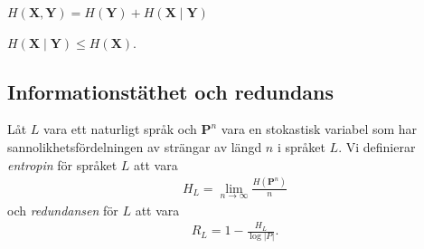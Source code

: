 \documentclass{beamer}
\let\stoch\mathbf{}
\begin{document}
\begin{frame}
  \begin{theorem}
    \(H(\stoch X, \stoch Y) = H(\stoch Y) + H(\stoch X\mid \stoch Y)\)
  \end{theorem}
%
%
  \begin{corollary}
    \(H(\stoch X\mid \stoch Y) \leq H(\stoch X)\).
  \end{corollary}
\end{frame}
%
%

\subsection{Informationstäthet och redundans}

\begin{frame}
  \begin{definition}
    Låt \(L\) vara ett naturligt språk och \(\stoch P^n\) vara en stokastisk 
    variabel som har sannolikhetsfördelningen av strängar av längd \(n\) 
    i språket \(L\).
    Vi definierar \emph{entropin} för språket \(L\) att vara
    \begin{align*}
      H_L = \lim_{n\to \infty}\frac{H(\stoch P^n)}{n}
    \end{align*}
    och \emph{redundansen} för \(L\) att vara
    \begin{align*}
      R_L = 1 - \frac{H_L}{\log |P|}.
    \end{align*}
  \end{definition}
\end{frame}
\end{document}
